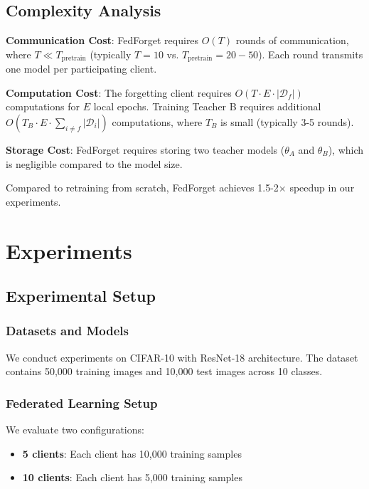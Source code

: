 \documentclass[11pt,a4paper]{article}
\begin{document}
\subsection{Complexity Analysis}

\textbf{Communication Cost}: FedForget requires $O(T)$ rounds of communication, where $T \ll T_{\text{pretrain}}$ (typically $T=10$ vs. $T_{\text{pretrain}}=20-50$). Each round transmits one model per participating client.

\textbf{Computation Cost}: The forgetting client requires $O(T \cdot E \cdot |\mathcal{D}_f|)$ computations for $E$ local epochs. Training Teacher B requires additional $O(T_B \cdot E \cdot \sum_{i \neq f} |\mathcal{D}_i|)$ computations, where $T_B$ is small (typically 3-5 rounds).

\textbf{Storage Cost}: FedForget requires storing two teacher models ($\theta_A$ and $\theta_B$), which is negligible compared to the model size.

Compared to retraining from scratch, FedForget achieves 1.5-2× speedup in our experiments.

\section{Experiments}

\subsection{Experimental Setup}

\subsubsection{Datasets and Models}

We conduct experiments on CIFAR-10 with ResNet-18 architecture. The dataset contains 50,000 training images and 10,000 test images across 10 classes.

\subsubsection{Federated Learning Setup}

We evaluate two configurations:
\begin{itemize}
\item \textbf{5 clients}: Each client has 10,000 training samples
\item \textbf{10 clients}: Each client has 5,000 training samples
\end{itemize}
\end{document}
